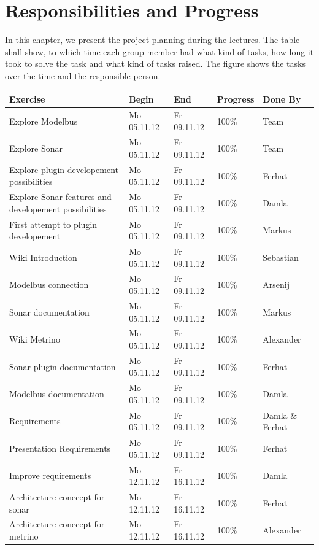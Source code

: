 \section{Responsibilities and Progress}
In this chapter, we present the project planning during the lectures. The table shall show, to which time each group member had what kind of tasks, how long it took to solve the task and what kind of tasks raised. The figure shows the tasks over the time and the responsible person.

\setlength{\LTleft}{-0.5cm} 
\begin{longtable}{|p{6cm}|p{2.5cm}|p{2.5cm}|p{1.7cm}|p{1.8cm}|} \hline
\textbf{Exercise} & \textbf{Begin} & \textbf{End} & \textbf{Progress} & \textbf{Done By} \\ \hline
Explore Modelbus & Mo 05.11.12 & Fr 09.11.12 & 100\% & Team \\
Explore Sonar & Mo 05.11.12 & Fr 09.11.12 & 100\% & Team \\ 
Explore plugin developement possibilities & Mo 05.11.12 & Fr 09.11.12 & 100\% & Ferhat \\ 
Explore Sonar features and developement possibilities & Mo 05.11.12 & Fr 09.11.12 & 100\% & Damla \\ 
First attempt to plugin developement & Mo 05.11.12 & Fr 09.11.12 & 100\% & Markus \\ 
Wiki Introduction & Mo 05.11.12 & Fr 09.11.12 & 100\% & Sebastian \\ 
Modelbus connection & Mo 05.11.12 & Fr 09.11.12 & 100\% & Arsenij \\ 
Sonar documentation & Mo 05.11.12 & Fr 09.11.12 & 100\% & Markus \\ 
Wiki Metrino & Mo 05.11.12 & Fr 09.11.12 & 100\% & Alexander \\ 
Sonar plugin documentation & Mo 05.11.12 & Fr 09.11.12 & 100\% & Ferhat \\ 
Modelbus documentation & Mo 05.11.12 & Fr 09.11.12 & 100\% & Damla \\ 
Requirements & Mo 05.11.12 & Fr 09.11.12 & 100\% & Damla \& Ferhat \\ 
Presentation Requirements & Mo 05.11.12 & Fr 09.11.12 & 100\% & Ferhat \\ 
Improve requirements & Mo 12.11.12 & Fr 16.11.12 & 100\% & Damla \\
Architecture conecept for sonar & Mo 12.11.12 & Fr 16.11.12 & 100\% & Ferhat \\ 
Architecture conecept for metrino & Mo 12.11.12 & Fr 16.11.12 & 100\% & Alexander \\ 

\end{longtable}
